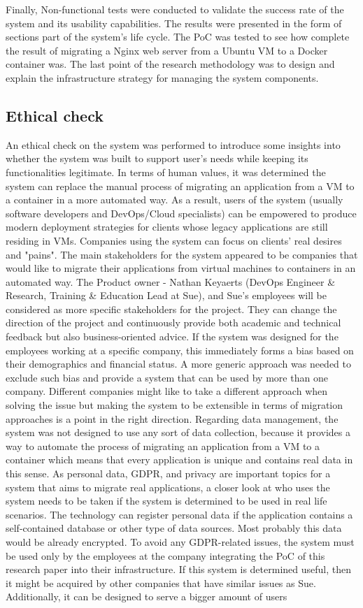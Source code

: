 \documentclass{article}
\begin{document}
\begin{multicols}{2}
Finally, Non-functional tests were conducted to validate the success rate of the system and its usability capabilities. The results were presented in the form of sections part of the system's life cycle. The PoC was tested to see how complete the result of migrating a Nginx web server from a Ubuntu VM to a Docker container was. The last point of the research methodology was to design and explain the infrastructure strategy for managing the system components.

\subsection{Ethical check}
An ethical check on the system was performed to introduce some insights into whether the system was built to support user's needs while keeping its functionalities legitimate. In terms of human values, it was determined the system can replace the manual process of migrating an application from a VM to a container in a more automated way. As a result, users of the system (usually software developers and DevOps/Cloud specialists) can be empowered to produce modern deployment strategies for clients whose legacy applications are still residing in VMs. Companies using the system can focus on clients' real desires and "pains". The main stakeholders for the system appeared to be companies that would like to migrate their applications from virtual machines to containers in an automated way. The Product owner - Nathan Keyaerts (DevOps Engineer \& Research, Training \& Education Lead at Sue), and Sue's employees will be considered as more specific stakeholders for the project. They can change the direction of the project and continuously provide both academic and technical feedback but also business-oriented advice. If the system was designed for the employees working at a specific company, this immediately forms a bias based on their demographics and financial status. A more generic approach was needed to exclude such bias and provide a system that can be used by more than one company. Different companies might like to take a different approach when solving the issue but making the system to be extensible in terms of migration approaches is a point in the right direction. Regarding data management, the system was not designed to use any sort of data collection, because it provides a way to automate the process of migrating an application from a VM to a container which means that every application is unique and contains real data in this sense. As personal data, GDPR, and privacy are important topics for a system that aims to migrate real applications, a closer look at who uses the system needs to be taken if the system is determined to be used in real life scenarios. The technology can register personal data if the application contains a self-contained database or other type of data sources. Most probably this data would be already encrypted. To avoid any GDPR-related issues, the system must be used only by the employees at the company integrating the PoC of this research paper into their infrastructure. If this system is determined useful, then it might be acquired by other companies that have similar issues as Sue. Additionally, it can be designed to serve a bigger amount of users 
\end{multicols}
\end{document}
